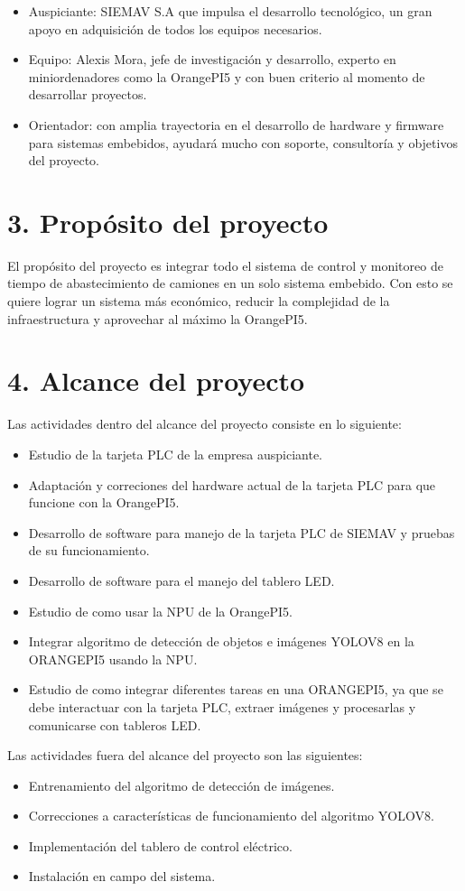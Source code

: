\documentclass[
11pt, %
]{charter}
\begin{document}
\begin{itemize}
	\item Auspiciante: SIEMAV S.A que impulsa el desarrollo tecnológico, un gran apoyo en adquisición de todos los equipos necesarios.
	\item Equipo: Alexis Mora, jefe de investigación y desarrollo, experto en miniordenadores como la OrangePI5 y con buen criterio al momento de desarrollar proyectos.
	\item Orientador: con amplia trayectoria en el desarrollo de hardware y firmware para sistemas embebidos, ayudará mucho con soporte, consultoría y objetivos del proyecto.
\end{itemize}


\section{3. Propósito del proyecto}
\label{sec:proposito}
El propósito del proyecto es integrar todo el sistema de control y monitoreo de tiempo de abastecimiento de camiones en un solo sistema embebido. Con esto se quiere lograr un sistema más económico, reducir la complejidad de la infraestructura y aprovechar al máximo la OrangePI5.

\section{4. Alcance del proyecto}
\label{sec:alcance}
Las actividades dentro del alcance del proyecto consiste en lo siguiente:
\begin{itemize}
	\item Estudio de la tarjeta PLC de la empresa auspiciante.
	\item Adaptación y correciones del hardware actual de la tarjeta PLC para que funcione con la OrangePI5. 
	\item Desarrollo de software para manejo de la tarjeta PLC de SIEMAV y pruebas de su funcionamiento.
	\item Desarrollo de software para el manejo del tablero LED.
	\item Estudio de como usar la NPU de la OrangePI5.
	\item Integrar algoritmo de detección de objetos e imágenes YOLOV8 en la ORANGEPI5 usando la NPU.
	\item Estudio de como integrar diferentes tareas en una ORANGEPI5, ya que se debe interactuar con la tarjeta PLC, extraer imágenes y procesarlas y comunicarse con tableros LED.
\end{itemize}
Las actividades fuera del alcance del proyecto son las siguientes:
\begin{itemize}
	\item Entrenamiento del algoritmo de detección de imágenes.
	\item Correcciones a características de funcionamiento del algoritmo YOLOV8.
	\item Implementación del tablero de control eléctrico.
	\item Instalación en campo del sistema.
\end{itemize}
\end{document}
